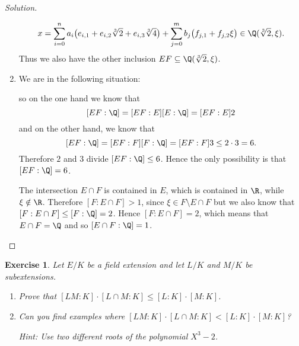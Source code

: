 \documentclass[a4paper,10pt,reqno]{amsart}
\newtheorem{ex}{Exercise}[section]
\newenvironment{sol}
  {\renewcommand\qedsymbol{$\blacksquare$}\begin{proof}[Solution]}
  {\end{proof}}
\begin{document}
\begin{sol}
\begin{enumerate}[label=(\roman*)]
    $$x=\sum_{i=0}^n a_i \big(e_{i,1}+e_{i,2}\sqrt[3]{2}+e_{i,3}\sqrt[3]{4}\big) +\sum_{j=0}^m b_j \big(f_{j,1}+f_{j,2}\xi\big)\in \Q(\sqrt[3]{2},\xi).$$
    Thus we also have the other inclusion $EF\subseteq \Q(\sqrt[3]{2},\xi)$.
    \item We are in the following situation:
    \
    \begin{center}
    \end{center}
    so on the one hand we know that
    \[
    [EF:\Q]=[EF:E][E:\Q]=[EF:E]2
    \]
    and on the other hand, we know that
    \[
    [EF:\Q]=[EF:F][F:\Q]=[EF:F]3\leq 2\cdot 3=6.
    \]
    Therefore $2$ and $3$ divide $[EF:\Q]\leq 6$.
    Hence the only possibility is that $[EF:\Q]=6$.

    The intersection $E\cap F$ is contained in $E$,
    which is contained in $\R$, while $\xi\notin\R$.
    Therefore $[F:E\cap F]>1$, since $\xi\in F\setminus E\cap F$  but we also know that $[F:E\cap F]\leq [F:\Q]=2$.
    Hence $[F:E\cap F]=2$, which means that $E\cap F=\Q$
    and so $[E\cap F:\Q]=1$.\qedhere    
\end{enumerate}
\end{sol}

\begin{ex}
\label{3.5}
    Let $E/K$ be a field extension and let $L/K$ and $M/K$ be subextensions.
    \begin{enumerate}[label=(\roman*)]
    \item Prove that $[LM : K ] \cdot [L \cap M : K] \leq [L:K] \cdot [M:K]$.
    \item Can you find examples where $[LM : K ] \cdot [L \cap M : K] < [L:K] \cdot [M:K]$?
    
    \noindent \textit{Hint:} Use two different roots of the polynomial $X^3 -2$.
    \end{enumerate}  
\end{ex}
\end{document}

